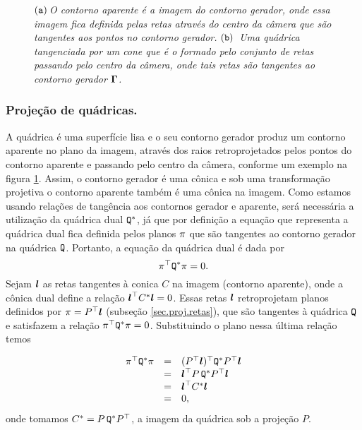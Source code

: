 \begin{figure}[htb!]
\centering
{}
\caption{\textit{$({\tt a})\,$O contorno aparente é a imagem do contorno gerador, onde essa imagem fica definida pelas retas através do centro da câmera que são tangentes aos pontos no contorno gerador.$\,\,({\tt b})\,$ Uma quádrica tangenciada por um cone que é o formado pelo conjunto de retas passando pelo centro da câmera, onde tais retas são tangentes ao contorno gerador ${\bf \Gamma}$. }}
\label{fig.cont-gerador-aparente}
\end{figure}

\subsubsection*{Projeção de quádricas.}
A quádrica é uma superfície lisa  e o seu contorno gerador produz um contorno aparente no plano da imagem, através dos raios retroprojetados pelos pontos do contorno aparente e passando pelo centro da câmera, conforme um exemplo na figura \ref{fig.cont-gerador-aparente}. Assim, o contorno gerador é uma cônica e sob uma transformação projetiva o contorno aparente também é uma cônica na imagem. Como estamos usando relações de tangência aos contornos gerador e aparente, será necessária a utilização da quádrica dual	${\tt Q}^*$, já que por definição a equação que representa a quádrica dual fica definida pelos planos $\pi$ que são tangentes ao contorno gerador na quádrica ${\tt Q}$. Portanto, a equação da quádrica dual é dada por
\begin{equation*}
\pi^\top {\tt Q}^*\pi=0.
\end{equation*}
Sejam $\boldsymbol{l}$ as retas tangentes à conica $C$ na imagem (contorno aparente), onde a cônica dual define a relação $\boldsymbol{l}^\top C^*\boldsymbol{l}=0$. Essas retas $\boldsymbol{l}$ retroprojetam planos definidos por $\pi=P^\top\boldsymbol{l}$ (subseção \ref{sec.proj.retas}), que são tangentes à quádrica ${\tt Q}$ e satisfazem a relação $\pi^\top {\tt Q}^*\pi=0$. Substituindo o plano nessa última relação temos

\begin{equation*}
\begin{array}{rcl}
\pi^\top {\tt Q}^*\pi&=&(P^\top\boldsymbol{l})^\top {\tt Q}^*P^\top\boldsymbol{l}\\
&=&\boldsymbol{l}^\top P\,{\tt Q}^*P^\top\boldsymbol{l}\\
&=&\boldsymbol{l}^\top C^*\boldsymbol{l}\\
&=&0,
\end{array}
\end{equation*}
onde tomamos $C^*=P\,{\tt Q}^*P^\top$, a imagem da quádrica sob a projeção $P$.

